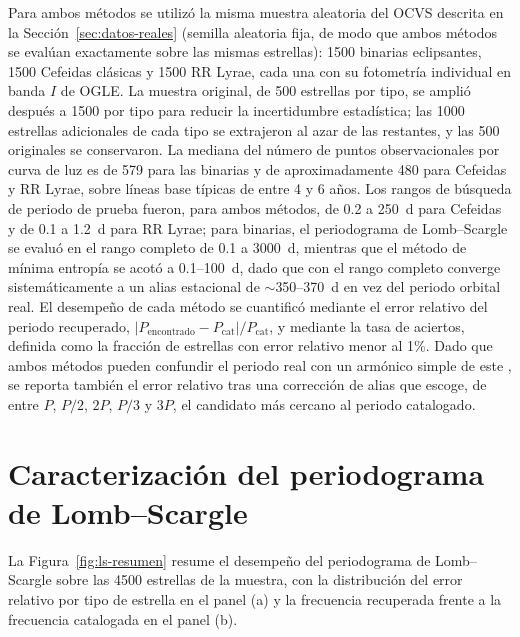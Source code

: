 \documentclass[12pt,letterpaper,oneside]{book}
\begin{document}
Para ambos m\'etodos se utiliz\'o la misma muestra aleatoria del OCVS descrita en la Secci\'on~\ref{sec:datos-reales} (semilla aleatoria fija, de modo que ambos m\'etodos se eval\'uan exactamente sobre las mismas estrellas): 1500 binarias eclipsantes, 1500 Cefeidas cl\'asicas y 1500 RR Lyrae, cada una con su fotometr\'ia individual en banda $I$ de OGLE. La muestra original, de 500 estrellas por tipo, se ampli\'o despu\'es a 1500 por tipo para reducir la incertidumbre estad\'istica; las 1000 estrellas adicionales de cada tipo se extrajeron al azar de las restantes, y las 500 originales se conservaron. La mediana del n\'umero de puntos observacionales por curva de luz es de 579 para las binarias y de aproximadamente 480 para Cefeidas y RR Lyrae, sobre l\'ineas base t\'ipicas de entre 4 y 6 a\~nos. Los rangos de b\'usqueda de periodo de prueba fueron, para ambos m\'etodos, de 0.2 a 250~d para Cefeidas y de 0.1 a 1.2~d para RR Lyrae; para binarias, el periodograma de Lomb--Scargle se evalu\'o en el rango completo de 0.1 a 3000~d, mientras que el m\'etodo de m\'inima entrop\'ia se acot\'o a 0.1--100~d, dado que con el rango completo converge sistem\'aticamente a un alias estacional de $\sim$350--370~d en vez del periodo orbital real. El desempe\~no de cada m\'etodo se cuantific\'o mediante el error relativo del periodo recuperado, $|P_{\text{encontrado}} - P_{\text{cat}}|/P_{\text{cat}}$, y mediante la tasa de aciertos, definida como la fracci\'on de estrellas con error relativo menor al 1\%. Dado que ambos m\'etodos pueden confundir el periodo real con un arm\'onico simple de este \citep{Graham2013}, se reporta tambi\'en el error relativo tras una correcci\'on de alias que escoge, de entre $P$, $P/2$, $2P$, $P/3$ y $3P$, el candidato m\'as cercano al periodo catalogado.

\section{Caracterizaci\'on del periodograma de Lomb--Scargle}
\label{sec:resultados-ls}

La Figura~\ref{fig:ls-resumen} resume el desempe\~no del periodograma de Lomb--Scargle sobre las 4500 estrellas de la muestra, con la distribuci\'on del error relativo por tipo de estrella en el panel (a) y la frecuencia recuperada frente a la frecuencia catalogada en el panel (b).
\end{document}
